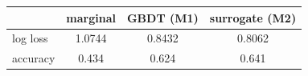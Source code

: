 \begin{tabular}{lccc}
\toprule
 & marginal & GBDT (M1) & surrogate (M2) \\
\midrule
log loss & 1.0744 & 0.8432 & 0.8062 \\
accuracy & 0.434 & 0.624 & 0.641 \\
\bottomrule
\end{tabular}
